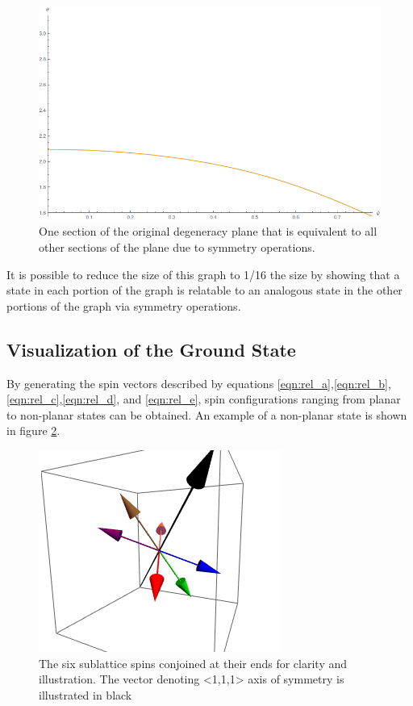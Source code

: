 \begin{figure}
	\includegraphics[width=\linewidth]{img/degeneracyplane.png}
	\caption{One section of the original degeneracy plane that is equivalent to all other sections of the plane due to symmetry operations.}
	\label{fig:degenplane}
\end{figure}

It is possible to reduce the size of this graph to 1/16 the size by showing that a state in each portion of the graph is relatable to an analogous state in the other portions of the graph via symmetry operations.
\clearpage

\subsection{Visualization of the Ground State}

By generating the spin vectors described by equations \ref{eqn:rel_a},\ref{eqn:rel_b},\ref{eqn:rel_c},\ref{eqn:rel_d}, and \ref{eqn:rel_e}, spin configurations ranging from planar to non-planar states can be obtained. An example of a non-planar state is shown in figure \ref{fig:sampgs}.

\begin{figure}[ht]
	\centering
	\includegraphics[scale=0.9]{img/samplegs.png}
	\caption{The six sublattice spins conjoined at their ends for clarity and illustration. The vector denoting <1,1,1> axis of symmetry is illustrated in black}
	\label{fig:sampgs}
\end{figure}

